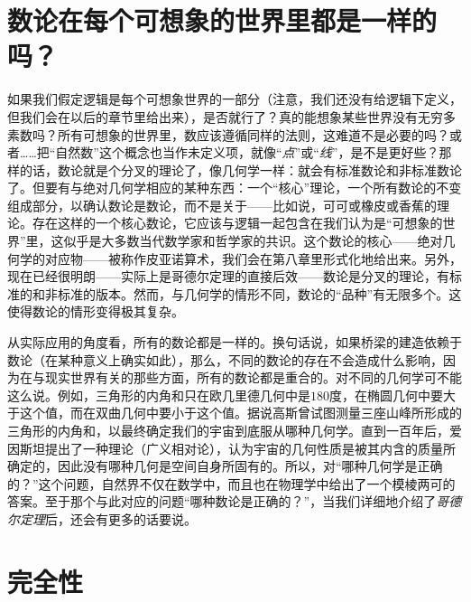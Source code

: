 \section{数论在每个可想象的世界里都是一样的吗？}

如果我们假定逻辑是每个可想象世界的一部分（注意，我们还没有给逻辑下定义，但我们会在以后的章节里给出来），是否就行了？真的能想象某些世界没有无穷多素数吗？所有可想象的世界里，数应该遵循同样的法则，这难道不是必要的吗？或者……把“自然数”这个概念也当作未定义项，就像“\emph{点}”或“\emph{线}”，是不是更好些？那样的话，数论就是个分叉的理论了，像几何学一样：就会有标准数论和非标准数论了。但要有与绝对几何学相应的某种东西：一个“核心”理论，一个所有数论的不变组成部分，以确认数论是数论，而不是关于——比如说，可可或橡皮或香蕉的理论。存在这样的一个核心数论，它应该与逻辑一起包含在我们认为是“可想象的世界”里，这似乎是大多数当代数学家和哲学家的共识。这个数论的核心——绝对几何学的对应物——被称作皮亚诺算术，我们会在第八章里形式化地给出来。另外，现在已经很明朗——实际上是哥德尔定理的直接后效——数论是分叉的理论，有标准的和非标准的版本。然而，与几何学的情形不同，数论的“品种”有无限多个。这使得数论的情形变得极其复杂。

从实际应用的角度看，所有的数论都是一样的。换句话说，如果桥梁的建造依赖于数论（在某种意义上确实如此），那么，不同的数论的存在不会造成什么影响，因为在与现实世界有关的那些方面，所有的数论都是重合的。对不同的几何学可不能这么说。例如，三角形的内角和只在欧几里德几何中是$180$度，在椭圆几何中要大于这个值，而在双曲几何中要小于这个值。据说高斯曾试图测量三座山峰所形成的三角形的内角和，以最终确定我们的宇宙到底服从哪种几何学。直到一百年后，爱因斯坦提出了一种理论（广义相对论），认为宇宙的几何性质是被其内含的质量所确定的，因此没有哪种几何是空间自身所固有的。所以，对“哪种几何学是正确的？”这个问题，自然界不仅在数学中，而且也在物理学中给出了一个模棱两可的答案。至于那个与此对应的问题“哪种数论是正确的？”，当我们详细地介绍了\emph{哥德尔定理}后，还会有更多的话要说。

\section{完全性}

